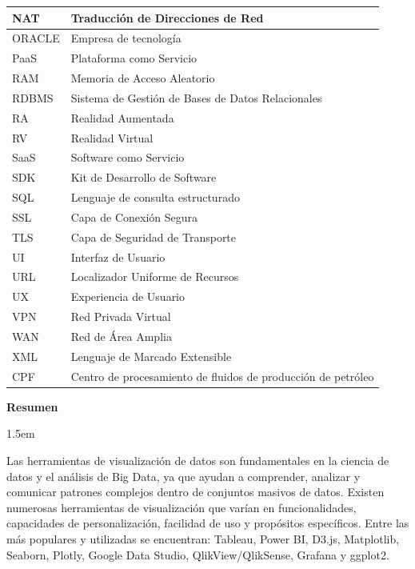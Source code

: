 \documentclass[
  11pt,
  bookmarksnumbered]{article}
\begin{document}
\begin{table}[H]
\begin{tabular}{|l|l|}
NAT & Traducción de Direcciones de Red \\ \hline
ORACLE & Empresa de tecnología \\ \hline
PaaS & Plataforma como Servicio \\ \hline
RAM & Memoria de Acceso Aleatorio \\ \hline
RDBMS & Sistema de Gestión de Bases de Datos Relacionales \\ \hline
RA & Realidad Aumentada \\ \hline
RV & Realidad Virtual \\ \hline
SaaS & Software como Servicio \\ \hline
SDK & Kit de Desarrollo de Software \\ \hline
SQL & Lenguaje de consulta estructurado \\ \hline
SSL & Capa de Conexión Segura \\ \hline
TLS & Capa de Seguridad de Transporte \\ \hline
UI & Interfaz de Usuario \\ \hline
URL & Localizador Uniforme de Recursos \\ \hline
UX & Experiencia de Usuario \\ \hline
VPN & Red Privada Virtual \\ \hline
WAN & Red de Área Amplia \\ \hline
XML & Lenguaje de Marcado Extensible \\ \hline
CPF & Centro de procesamiento de fluidos de producción de petróleo \\ \hline
\end{tabular}
\end{table}

\newpage

\begin{center}
\textbf{Resumen}
\end{center}

\par
\begingroup
\leftskip1.5em
\rightskip\leftskip

Las herramientas de visualización de datos son fundamentales en la ciencia de datos y el análisis de Big Data, ya que ayudan a comprender, analizar y comunicar patrones complejos dentro de conjuntos masivos de datos.
Existen numerosas herramientas de visualización que varían en funcionalidades, capacidades de personalización, facilidad de uso y propósitos específicos.
Entre las más populares y utilizadas se encuentran: Tableau, Power BI, D3.js, Matplotlib, Seaborn, Plotly, Google Data Studio, QlikView/QlikSense, Grafana y ggplot2.
\end{document}

